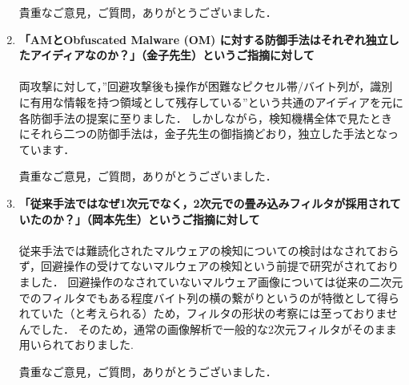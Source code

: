 \documentclass[11pt, a4paper]{article}
\begin{document}
\begin{enumerate}
	貴重なご意見，ご質問，ありがとうございました．
  \vspace{10mm}

  \item \textbf{「AMとObfuscated Malware (OM) に対する防御手法はそれぞれ独立したアイディアなのか？」（金子先生）というご指摘に対して}\\ \\
    	両攻撃に対して，”回避攻撃後も操作が困難なピクセル帯/バイト列が，識別に有用な情報を持つ領域として残存している”という共通のアイディアを元に各防御手法の提案に至りました．
	しかしながら，検知機構全体で見たときにそれら二つの防御手法は，金子先生の御指摘どおり，独立した手法となっています．

	貴重なご意見，ご質問，ありがとうございました．


  \item \textbf{「従来手法ではなぜ1次元でなく，2次元での畳み込みフィルタが採用されていたのか？」（岡本先生）というご指摘に対して}\\ \\
	従来手法では難読化されたマルウェアの検知についての検討はなされておらず，回避操作の受けてないマルウェアの検知という前提で研究がされておりました．
	回避操作のなされていないマルウェア画像については従来の二次元でのフィルタでもある程度バイト列の横の繋がりというのが特徴として得られていた（と考えられる）ため，フィルタの形状の考察には至っておりませんでした．
	そのため，通常の画像解析で一般的な2次元フィルタがそのまま用いられておりました.
    
	貴重なご意見，ご質問，ありがとうございました．
  \vspace{10mm}
\end{enumerate}
\end{document}
